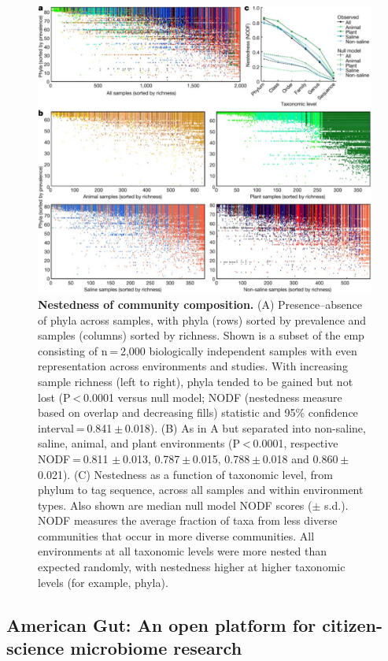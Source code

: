 \begin{figure}[htbp]
\includegraphics[width=\columnwidth]{chapter_contributions_figures/EMPNestedness.pdf}
\caption[Nestedness of community composition]{\textbf{Nestedness of community composition.}
(A) Presence–absence of phyla across samples, with phyla (rows) sorted by prevalence and samples
(columns) sorted by richness. Shown is a subset of the \gls{emp} consisting of n = 2,000
biologically independent samples with even representation across environments and studies.
With increasing sample richness (left to right), phyla tended to be gained but not lost
(P < 0.0001 versus null model; NODF (nestedness measure based on overlap and decreasing fills)
statistic and 95\% confidence interval = 0.841 $\pm$ 0.018). (B) As in A but separated into
non-saline, saline, animal, and plant environments (P < 0.0001, respective NODF = 0.811
$\pm$ 0.013, 0.787 $\pm$ 0.015, 0.788 $\pm$ 0.018 and 0.860 $\pm$ 0.021). (C) Nestedness as
a function of taxonomic level, from phylum to tag sequence, across all samples and within
environment types. Also shown are median null model NODF scores ($\pm$ s.d.).
NODF measures the average fraction of taxa from less diverse communities that occur in
more diverse communities. All environments at all taxonomic levels were more nested than
expected randomly, with nestedness higher at higher taxonomic levels (for example, phyla).}
\label{EMPNestedness}
\end{figure}

\subsection{American Gut: An open platform for citizen-science microbiome research}\label{subsection_ag}

